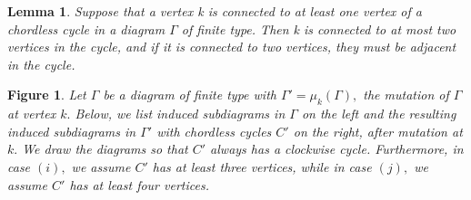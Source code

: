 \documentclass[11pt]{amsart}
\newtheorem{lem}[thm]{Lemma}
\newtheorem{longfig}[thm]{Figure}
\theoremstyle{definition}
\begin{document}
\begin{lem} \cite[Lemma 2.4]{BM13}
Suppose that a vertex k is connected to at least one vertex of a chordless cycle in a diagram $\Gamma$ of finite type. Then k is connected to at most two vertices in the cycle, and if it is connected to two vertices, they must be adjacent in the cycle.
\end{lem}

\begin{longfig}
\label{fig:cycle_types}
Let $\Gamma$ be a diagram of finite type with $\Gamma' = \mu_k(\Gamma),$ the mutation of $\Gamma$ at vertex $k.$ Below, we list induced subdiagrams in $\Gamma$ on the left and the resulting induced subdiagrams in $\Gamma'$ with chordless cycles $C'$ on the right, after mutation at $k.$ We draw the diagrams so that $C'$ always has a clockwise cycle. Furthermore, in case $(i),$ we assume $C'$ has at least three vertices, while in case $(j),$ we assume $C'$ has at least four vertices. 


\end{longfig}
\end{document}
